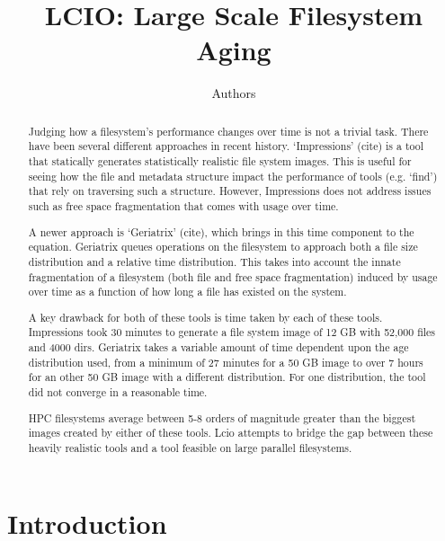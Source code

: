 \documentclass[11pt]{amsart}
\title{LCIO: Large Scale Filesystem Aging}
\author{Authors}
\begin{document}
\maketitle

\begin{abstract}
Judging how a filesystem's performance changes over time is not a trivial task. There have been
several different approaches in recent history. `Impressions' (cite) is a tool that statically
generates statistically realistic file system images. This is useful for seeing how the 
file and metadata structure impact the performance of tools (e.g. `find') that rely on
traversing such a structure. However, Impressions does not address issues such as free space
fragmentation that comes with usage over time. 

A newer approach is `Geriatrix' (cite), which brings in this time component to the 
equation. Geriatrix queues operations on the filesystem to approach both a file size 
distribution and a relative 
time distribution. This takes into account the innate fragmentation of a filesystem 
(both file and free space fragmentation) induced by usage over time as a function of how long 
a file has existed on the system.

A key drawback for both of these tools is time taken by each of these tools. Impressions took
30 minutes to generate a file system image of 12 GB with 52,000 files and 4000 dirs. Geriatrix
takes a variable amount of time dependent upon the age distribution used, from a minimum of 27 minutes
for a 50 GB image to over 7 hours for an other 50 GB image with a different distribution. For one 
distribution, the tool did not converge in a reasonable time. 

HPC filesystems average between 5-8 orders of magnitude greater than the biggest images created by 
either of these tools. Lcio attempts to bridge the gap between these heavily realistic tools and a 
tool feasible on large parallel filesystems. 
\end{abstract}

\section{Introduction}
\end{document}

